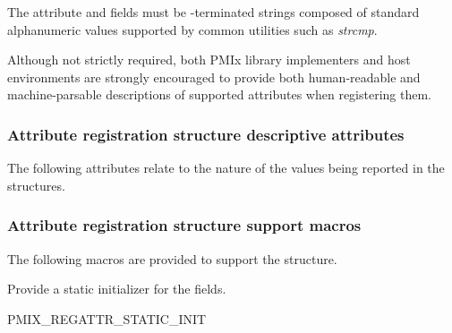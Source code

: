 The attribute  and  fields must be -terminated strings composed of standard alphanumeric values supported by common utilities such as \textit{strcmp}.

Although not strictly required, both \ac{PMIx} library implementers and host environments are strongly encouraged to provide both human-readable and machine-parsable descriptions of supported attributes when registering them.

\subsubsection{Attribute registration structure descriptive attributes}
\label{api:struct:attributes:descr}

The following attributes relate to the nature of the values being reported
in the  structures.

%
%

\subsubsection{Attribute registration structure support macros}

The following macros are provided to support the  structure.


Provide a static initializer for the  fields.

\cspecificstart
\begin{codepar}
PMIX_REGATTR_STATIC_INIT
\end{codepar}
\cspecificend


